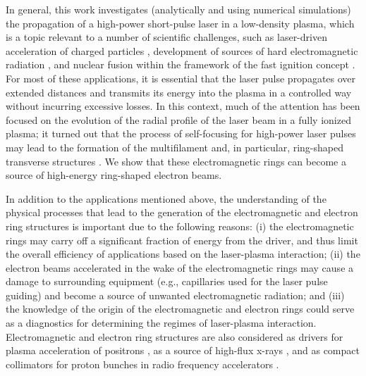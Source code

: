 \documentclass[10pt, a4paper, twoside, openright]{report}
\begin{document}
In general, this work investigates (analytically and using numerical simulations) the propagation of a high-power short-pulse laser in a low-density plasma, which is a topic relevant to a number of scientific challenges, such as laser-driven acceleration of charged particles \cite{Tajima1979, Esarey2009, Gonsalves2019}, development of sources of hard electromagnetic radiation \cite{Pirozhkov2012, Bulanov2013}, and nuclear fusion within the framework of the fast ignition concept \cite{Tabak1994}. For most of these applications, it is essential that the laser pulse propagates over extended distances and transmits its energy into the plasma in a controlled way without incurring excessive losses. In this context, much of the attention has been focused on the evolution of the radial profile of the laser beam in a fully ionized plasma; it turned out that the process of self-focusing for high-power laser pulses may lead to the formation of the multifilament and, in particular, ring-shaped transverse structures \cite{Mori1988, Cohen1991, Borisov1992, Krushelnick1997, Cattani2001, Kim2002, Naseri2016, Kovalev2019}. We show that these electromagnetic rings can become a source of high-energy ring-shaped electron beams. 

In addition to the applications mentioned above, the understanding of the physical processes that lead to the generation of the electromagnetic and electron ring structures is important due to the following reasons: (i) the electromagnetic rings may carry off a significant fraction of energy from the driver, and thus limit the overall efficiency of applications based on the laser-plasma interaction; (ii) the electron beams accelerated in the wake of the electromagnetic rings may cause a damage to surrounding equipment (e.g., capillaries used for the laser pulse guiding) and become a source of unwanted electromagnetic radiation; and (iii) the knowledge of the origin of the electromagnetic and electron rings could serve as a diagnostics for determining the regimes of laser-plasma interaction. Electromagnetic and electron ring structures are also considered as drivers for plasma acceleration of positrons \cite{Jain2015, Jain2019}, as a source of high-flux x-rays \cite{Zhao2016}, and as compact collimators for proton bunches in radio frequency accelerators \cite{Stancari2011}.
\end{document}
